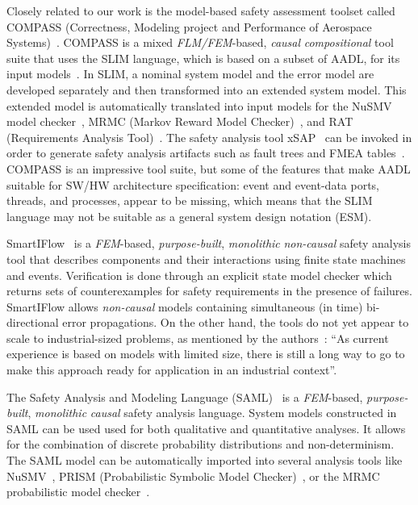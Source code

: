 Closely related to our work is the model-based safety assessment toolset called COMPASS (Correctness, Modeling project and Performance of Aerospace Systems)~\cite{10.1007/978-3-642-04468-7_15}.  COMPASS is a mixed {\em FLM/FEM}-based, {\em causal} {\em compositional} tool suite that uses the SLIM language, which is based on a subset of AADL, for its input models~\cite{5185388, criticalembeddedsystems}. In SLIM, a nominal system model and the error model are developed separately and then transformed into an extended system model.  This extended model is automatically translated into input models for the NuSMV model checker~\cite{Cimatti2000, NuSMV}, MRMC (Markov Reward Model Checker)~\cite{Katoen:2005:MRM:1114692.1115230, MRMC}, and RAT (Requirements Analysis Tool)~\cite{RAT}. The safety analysis tool xSAP~\cite{DBLP:conf/tacas/BittnerBCCGGMMZ16} can be invoked in order to generate safety analysis artifacts such as fault trees and FMEA tables~\cite{compass30toolset}.  COMPASS is an impressive tool suite, but some of the features that make AADL suitable for SW/HW architecture specification: event and event-data ports, threads, and processes, appear to be missing, which means that the SLIM language may not be suitable as a general system design notation (ESM).

SmartIFlow~\cite{info8010007} is a {\em FEM}-based, {\em purpose-built}, {\em monolithic} {\em non-causal} safety analysis tool that describes components and their interactions using finite state machines and events. Verification is done through an explicit state model checker which returns sets of counterexamples for safety requirements in the presence of failures.  SmartIFlow allows {\em non-causal} models containing simultaneous (in time) bi-directional %
error propagations.  On the other hand, the tools do not yet appear to scale to industrial-sized problems, as mentioned by the authors~\cite{info8010007}: ``As current experience is based on models with limited size, there is still a long way to go to make this approach ready for application in an industrial context''.


The Safety Analysis and Modeling Language (SAML)~\cite{Gudemann:2010:FQQ:1909626.1909813} is a {\em FEM}-based, {\em purpose-built}, {\em monolithic} {\em causal} safety analysis language.  System models constructed in SAML can be used used for both qualitative and quantitative analyses. It allows for the combination of discrete probability distributions and non-determinism. The SAML model can be automatically imported into several analysis tools like NuSMV~\cite{Cimatti2000}, PRISM (Probabilistic Symbolic Model Checker)~\cite{CAV2011:KwNoPa}, or the MRMC probabilistic model checker~\cite{Katoen:2005:MRM:1114692.1115230}. 

